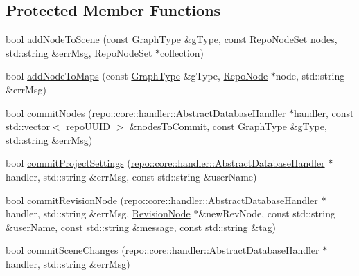 \subsection*{Protected Member Functions}
\begin{DoxyCompactItemize}
\item 
bool \hyperlink{classrepo_1_1core_1_1model_1_1_repo_scene_aee067257987618315ab9674684c375a1}{add\+Node\+To\+Scene} (const \hyperlink{classrepo_1_1core_1_1model_1_1_repo_scene_aefcacd6eb4c7774ac1bfe3a6b223337c}{Graph\+Type} \&g\+Type, const Repo\+Node\+Set nodes, std\+::string \&err\+Msg, Repo\+Node\+Set $\ast$collection)
\item 
bool \hyperlink{classrepo_1_1core_1_1model_1_1_repo_scene_a1005f9eaa9e3a0bdeb03814b3ed688f9}{add\+Node\+To\+Maps} (const \hyperlink{classrepo_1_1core_1_1model_1_1_repo_scene_aefcacd6eb4c7774ac1bfe3a6b223337c}{Graph\+Type} \&g\+Type, \hyperlink{classrepo_1_1core_1_1model_1_1_repo_node}{Repo\+Node} $\ast$node, std\+::string \&err\+Msg)
\item 
bool \hyperlink{classrepo_1_1core_1_1model_1_1_repo_scene_a37e3a23d88ff4e24bdef2c224c1f6d3f}{commit\+Nodes} (\hyperlink{classrepo_1_1core_1_1handler_1_1_abstract_database_handler}{repo\+::core\+::handler\+::\+Abstract\+Database\+Handler} $\ast$handler, const std\+::vector$<$ repo\+U\+U\+I\+D $>$ \&nodes\+To\+Commit, const \hyperlink{classrepo_1_1core_1_1model_1_1_repo_scene_aefcacd6eb4c7774ac1bfe3a6b223337c}{Graph\+Type} \&g\+Type, std\+::string \&err\+Msg)
\item 
bool \hyperlink{classrepo_1_1core_1_1model_1_1_repo_scene_a3656d3d7e00d3d5513e6a8f356e99bc7}{commit\+Project\+Settings} (\hyperlink{classrepo_1_1core_1_1handler_1_1_abstract_database_handler}{repo\+::core\+::handler\+::\+Abstract\+Database\+Handler} $\ast$handler, std\+::string \&err\+Msg, const std\+::string \&user\+Name)
\item 
bool \hyperlink{classrepo_1_1core_1_1model_1_1_repo_scene_a998e632854f0652dd2a6033055b33c12}{commit\+Revision\+Node} (\hyperlink{classrepo_1_1core_1_1handler_1_1_abstract_database_handler}{repo\+::core\+::handler\+::\+Abstract\+Database\+Handler} $\ast$handler, std\+::string \&err\+Msg, \hyperlink{classrepo_1_1core_1_1model_1_1_revision_node}{Revision\+Node} $\ast$\&new\+Rev\+Node, const std\+::string \&user\+Name, const std\+::string \&message, const std\+::string \&tag)
\item 
bool \hyperlink{classrepo_1_1core_1_1model_1_1_repo_scene_ac00889d23e2887fccad4e57d47bd6356}{commit\+Scene\+Changes} (\hyperlink{classrepo_1_1core_1_1handler_1_1_abstract_database_handler}{repo\+::core\+::handler\+::\+Abstract\+Database\+Handler} $\ast$handler, std\+::string \&err\+Msg)

\end{DoxyCompactItemize}
